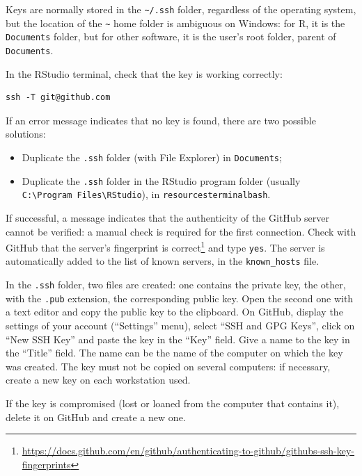 \documentclass[
  12pt,
  american,
  a4paper,
  extrafontsizes,onecolumn,openright
  ]{memoir}
\providecommand{\tightlist}{%
  \setlength{\itemsep}{0pt}\setlength{\parskip}{0pt}}
\begin{document}
Keys are normally stored in the \texttt{\textasciitilde{}/.ssh} folder, regardless of the operating system, but the location of the \texttt{\textasciitilde{}} home folder is ambiguous on Windows: for R, it is the \texttt{Documents} folder, but for other software, it is the user's root folder, parent of \texttt{Documents}.

In the RStudio terminal, check that the key is working correctly:

\begin{verbatim}
ssh -T git@github.com
\end{verbatim}

If an error message indicates that no key is found, there are two possible solutions:

\begin{itemize}
\tightlist
\item
  Duplicate the \texttt{.ssh} folder (with File Explorer) in \texttt{Documents};
\item
  Duplicate the \texttt{.ssh} folder in the RStudio program folder (usually \texttt{C:\textbackslash{}Program\ Files\textbackslash{}RStudio}), in \texttt{resourcesterminalbash}.
\end{itemize}

If successful, a message indicates that the authenticity of the GitHub server cannot be verified: a manual check is required for the first connection.
Check with GitHub that the server's fingerprint is correct\footnote{\url{https://docs.github.com/en/github/authenticating-to-github/githubs-ssh-key-fingerprints}} and type \texttt{yes}.
The server is automatically added to the list of known servers, in the \texttt{known\_hosts} file.

In the \texttt{.ssh} folder, two files are created: one contains the private key, the other, with the \texttt{.pub} extension, the corresponding public key.
Open the second one with a text editor and copy the public key to the clipboard.
On GitHub, display the settings of your account (\enquote{Settings} menu), select \enquote{SSH and GPG Keys}, click on \enquote{New SSH Key} and paste the key in the \enquote{Key} field.
Give a name to the key in the \enquote{Title} field.
The name can be the name of the computer on which the key was created.
The key must not be copied on several computers: if necessary, create a new key on each workstation used.

If the key is compromised (lost or loaned from the computer that contains it), delete it on GitHub and create a new one.
\end{document}
